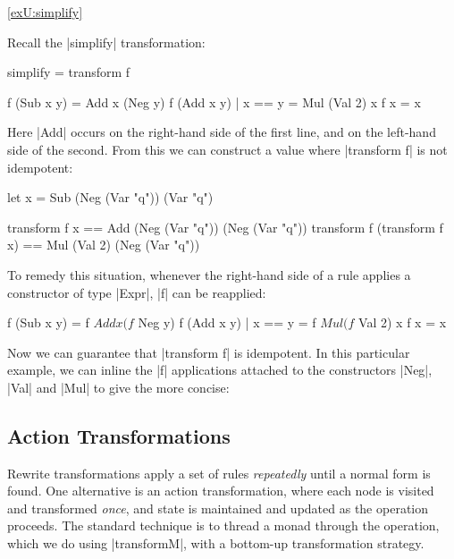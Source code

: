 \begin{examplerevisit}{\ref{exU:simplify}}

Recall the |simplify| transformation:

\begin{code}
simplify = transform f
\end{code}
\begin{code}
f (Sub x y)           = Add x (Neg y)
f (Add x y) | x == y  = Mul (Val 2) x
f x                   = x
\end{code}

Here |Add| occurs on the right-hand side of the first line, and on the left-hand side of the second. From this we can construct a value where |transform f| is not idempotent:

\ignore\begin{code}
let x = Sub (Neg (Var "q")) (Var "q")

transform f x                == Add (Neg (Var "q")) (Neg (Var "q"))
transform f (transform f x)  == Mul (Val 2) (Neg (Var "q"))
\end{code}

To remedy this situation, whenever the right-hand side of a rule applies a constructor of type |Expr|, |f| can be reapplied:

\begin{code}
f (Sub x y)           = f $ Add x (f $ Neg y)
f (Add x y) | x == y  = f $ Mul (f $ Val 2) x
f x                   = x
\end{code}

Now we can guarantee that |transform f| is idempotent. In this particular example, we can inline the |f| applications attached to the constructors |Neg|, |Val| and |Mul| to give the more concise:

\codeexample
\end{examplerevisit}


\subsection{Action Transformations}

Rewrite transformations apply a set of rules \textit{repeatedly} until a normal form is found. One alternative is an action transformation, where each node is visited and transformed \textit{once}, and state is maintained and updated as the operation proceeds. The standard technique is to thread a monad through the operation, which we do using |transformM|, with a bottom-up transformation strategy.

